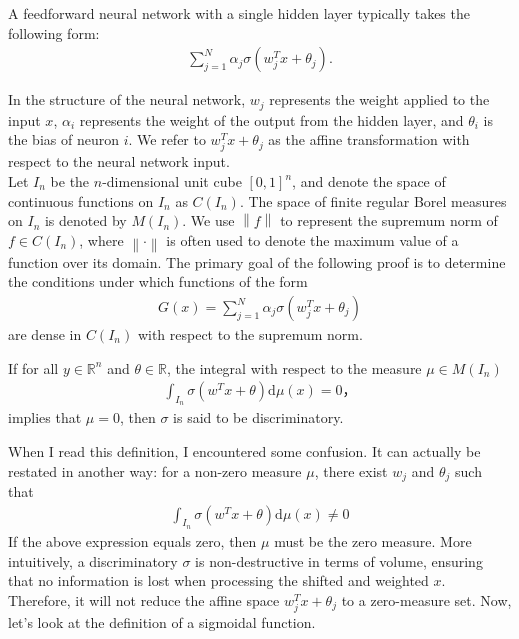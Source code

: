 \documentclass[12pt]{article}
\begin{document}
A feedforward neural network with a single hidden layer typically takes the following form:
\begin{align*}
    \sum_{j=1}^N \alpha_j \sigma (w_j^T x +\theta_j).
\end{align*}

In the structure of the neural network, $w_j$ represents the weight applied to the input $x$, $\alpha_i$ represents the weight of the output from the hidden layer, and $\theta_i$ is the bias of neuron $i$. We refer to $w_j^T x + \theta_j$ as the affine transformation with respect to the neural network input.\\

Let $I_n$ be the $n$-dimensional unit cube $[0,1]^n$, and denote the space of continuous functions on $I_n$ as $C(I_n)$. The space of finite regular Borel measures on $I_n$ is denoted by $M(I_n)$. We use $\left\lVert f\right\rVert$ to represent the supremum norm of $f \in C(I_n)$, where $\left\lVert \cdot\right\rVert$ is often used to denote the maximum value of a function over its domain. The primary goal of the following proof is to determine the conditions under which functions of the form
\begin{align*}
    G(x)= \sum_{j=1}^N \alpha_j \sigma (w_j^T x +\theta_j)
\end{align*}
are dense in $C(I_n)$ with respect to the supremum norm.

\begin{mydefinition}
If for all $y \in \mathbb{R}^n$ and $\theta \in \mathbb{R}$, the integral with respect to the measure $\mu \in M(I_n)$
    \begin{align*}
        \int_{I_n} \sigma(w^Tx+\theta)\mathrm{d}\mu(x)=0，
    \end{align*}
    implies that $\mu = 0$, then $\sigma$ is said to be discriminatory.
\end{mydefinition}
When I read this definition, I encountered some confusion. It can actually be restated in another way: for a non-zero measure $\mu$, there exist $w_j$ and $\theta_j$ such that
\begin{align*}
\int_{I_n}\sigma(w^Tx+\theta)\mathrm{d}\mu(x)\neq 0
\end{align*}
If the above expression equals zero, then $\mu$ must be the zero measure. More intuitively, a discriminatory $\sigma$ is non-destructive in terms of volume, ensuring that no information is lost when processing the shifted and weighted $x$. Therefore, it will not reduce the affine space $w_j^T x + \theta_j$ to a zero-measure set. Now, let’s look at the definition of a sigmoidal function.
\end{document}

